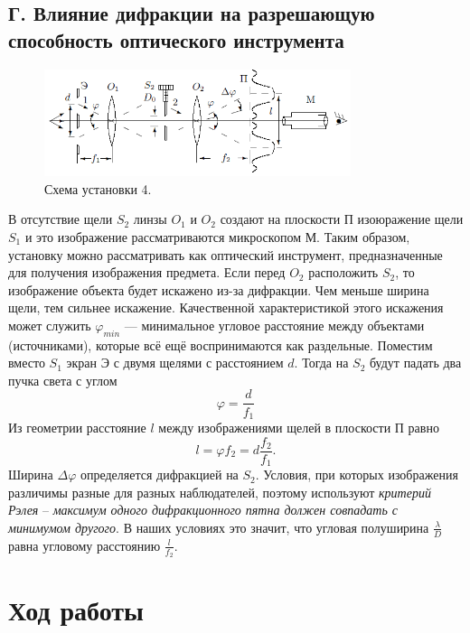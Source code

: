 \documentclass[a4paper,12pt]{article}
\begin{document}
	\subsection*{Г. Влияние дифракции на разрешающую способность оптического инструмента}
	\begin{figure}[h]
		\includegraphics[width = 0.8\textwidth]{431-6.png}
		\centering
		\caption{Схема установки 4.}
	\end{figure}
	В отсутствие щели $S_2$ линзы $O_1$ и $O_2$ создают на плоскости П изоюражение щели $S_1$ и это изображение рассматриваются микроскопом М. Таким образом, установку можно рассматривать как оптический инструмент, предназначенные для получения изображения предмета. Если перед $O_2$ расположить $S_2$, то изображение объекта будет искажено из-за дифракции. Чем меньше ширина щели, тем сильнее искажение. Качественной характеристикой этого искажения может служить $\varphi_{min}$ --- минимальное угловое расстояние между объектами (источниками), которые всё ещё воспринимаются как раздельные. Поместим вместо $S_1$ экран Э с двумя щелями с расстоянием $d$. Тогда на $S_2$ будут падать два пучка света с углом
	\begin{equation}
	\varphi = \dfrac{d}{f_1}
	\end{equation}
	Из геометрии расстояние $l$ между изображениями щелей в плоскости П равно 
	\begin{equation}
	l = \varphi f_2 = d \dfrac{f_2}{f_1}.
	\end{equation}
	Ширина $\Delta \varphi$ определяется дифракцией на $S_2$. Условия, при которых изображения различимы разные для разных наблюдателей, поэтому используют \textit{критерий Рэлея} -- \textit{максимум одного дифракционного пятна должен совпадать с минимумом другого}. В наших условиях это значит, что угловая полуширина $\frac{\lambda}{D}$ равна угловому расстоянию $\frac{l}{f_2}$.
	
\section*{Ход работы}
\end{document}
